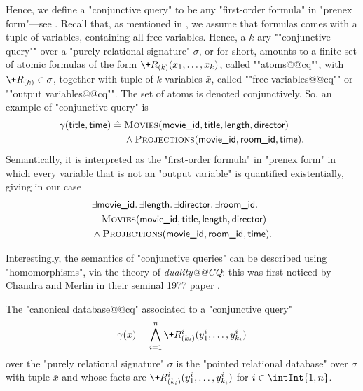 Hence, we define a \AP"conjunctive query" to be
any "first-order formula" in "prenex form"---see .
Recall that, as mentioned in ,
we assume that formulas comes with a tuple of variables,
containing all free variables.
Hence, a $k$-ary \AP""conjunctive query"" over a "purely relational signature" $\sigma$,
or  for short, amounts to a finite set
of atomic formulas of the form $\+R_{(k)}(x_1,\hdots,x_k)$,
called ""atoms@@cq"", with $\+R_{(k)} \in \sigma$,
together with tuple of $k$ variables $\bar x$, called ""free variables@@cq""
or ""output variables@@cq"". The set of atoms is denoted conjunctively.
So, an example of "conjunctive query" is
\begin{align*}
	\gamma(\textsf{title}, \textsf{time}) \mathrel{\hat{=}}\; 
	& \textsc{Movies}(\textsf{movie\_id}, \textsf{title}, \textsf{length}, \textsf{director}) \\
	& \land
	\textsc{Projections}(\textsf{movie\_id}, \textsf{room\_id}, \textsf{time}).
\end{align*} 
Semantically, it is interpreted as the "first-order formula" in "prenex form"
in which every variable that is not an "output variable" is quantified existentially,
giving in our case
\begin{align*}
	& \exists \textsf{movie\_id}.\, 
	\exists \textsf{length}.\, 
	\exists \textsf{director}.\,
	\exists \textsf{room\_id}.\, \\
	& \hphantom{\land~} \textsc{Movies}(\textsf{movie\_id}, \textsf{title}, \textsf{length}, \textsf{director}) \\
	& \land
	\textsc{Projections}(\textsf{movie\_id}, \textsf{room\_id}, \textsf{time}).
\end{align*} 

Interestingly, the semantics of "conjunctive queries" can be described using "homomorphisms",
via the theory of \emph{duality@@CQ}: this was first noticed by Chandra and Merlin in
their seminal 1977 paper \cite{ChandraMerlin1977Implementation}.
\begin{definition}
	The "canonical database@@cq" associated to a "conjunctive query"
	\[
		\gamma(\bar x) = \bigwedge_{i=1}^n \+R^i_{(k_i)}(y^i_1,\dotsc,y^i_{k_i})
	\]
	over the "purely relational signature" $\sigma$ is the "pointed relational database"
	over $\sigma$ with tuple $\bar x$ and whose facts are
	$\+R^i_{(k_i)}(y^i_1,\dotsc,y^i_{k_i})$ for $i \in \intInt{1,n}$.
\end{definition}

